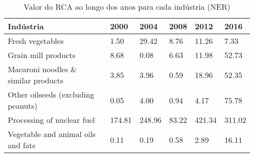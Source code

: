 \begin{table}
\centering
\caption{Valor do RCA ao longo dos anos para cada indústria (NER)}
\label{tab:ex3-tempo-NER}
\begin{tabular}{p{6cm}p{1.5cm}p{1.5cm}p{1.5cm}p{1.5cm}p{1.5cm}}
\toprule
                          Indústria &   2000 &   2004 &  2008 &   2012 &   2016 \\
\midrule
                   Fresh vegetables &   1.50 &  29.42 &  8.76 &  11.26 &   7.33 \\
                Grain mill products &   8.68 &   0.08 &  6.63 &  11.98 &  52.73 \\
Macaroni noodles \& similar products &   3.85 &   3.96 &  0.59 &  18.96 &  52.35 \\
 Other oilseeds (excluding peanuts) &   0.05 &   4.00 &  0.94 &   4.17 &  75.78 \\
         Processing of nuclear fuel & 174.81 & 248.96 & 83.22 & 421.34 & 311.02 \\
 Vegetable and animal oils and fats &   0.11 &   0.19 &  0.58 &   2.89 &  16.11 \\
\bottomrule
\end{tabular}
\end{table}
